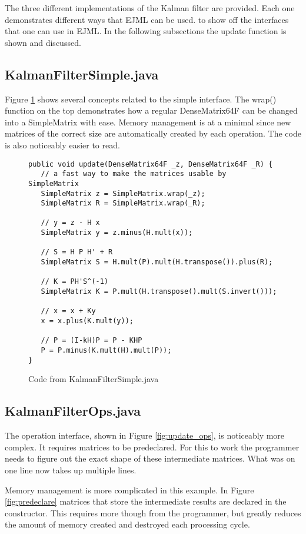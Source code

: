 \documentclass[12pt]{article}%
\begin{document}
The three different implementations of the Kalman filter are provided.  Each one demonstrates different ways that EJML can be used. to show off the interfaces that one can use in EJML.  In the following subsections the update function is shown and discussed.

\subsection{KalmanFilterSimple.java}
Figure \ref{fig:update_simple} shows several concepts related to the simple interface.  The wrap() function on the top demonstrates how a regular DenseMatrix64F can be changed into a SimpleMatrix with ease.  Memory management is at a minimal since new matrices of the correct size are automatically created by each operation.  The code is also noticeably easier to read.

\begin{figure}[h]
\begin{verbatim}
public void update(DenseMatrix64F _z, DenseMatrix64F _R) {
   // a fast way to make the matrices usable by SimpleMatrix
   SimpleMatrix z = SimpleMatrix.wrap(_z);
   SimpleMatrix R = SimpleMatrix.wrap(_R);

   // y = z - H x
   SimpleMatrix y = z.minus(H.mult(x));

   // S = H P H' + R
   SimpleMatrix S = H.mult(P).mult(H.transpose()).plus(R);

   // K = PH'S^(-1)
   SimpleMatrix K = P.mult(H.transpose().mult(S.invert()));

   // x = x + Ky
   x = x.plus(K.mult(y));

   // P = (I-kH)P = P - KHP
   P = P.minus(K.mult(H).mult(P));
}
\end{verbatim} 
\caption{\label{fig:update_simple}Code from KalmanFilterSimple.java}
\end{figure}

\subsection{KalmanFilterOps.java}
The operation interface, shown in Figure \ref{fig:update_ops}, is noticeably more complex.  It requires matrices to be predeclared.  For this to work the programmer needs to figure out the exact shape of these intermediate matrices.  What was on one line now takes up multiple lines.

Memory management is more complicated in this example.  In Figure \ref{fig:predeclare} matrices that store the intermediate results are declared in the constructor.  This requires more though from the programmer, but greatly reduces the amount of memory created and destroyed each processing cycle. 
\end{document}
